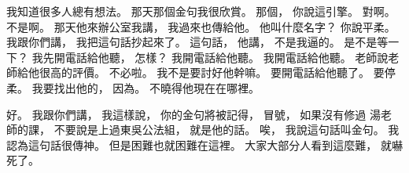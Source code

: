 \hypertarget{w01:cue:3333}{}我知道很多人總有想法。
\hypertarget{w01:cue:3334}{}那天那個金句我很欣賞。
\hypertarget{w01:cue:3335}{}那個，
\hypertarget{w01:cue:3336}{}你說這引擎。
\hypertarget{w01:cue:3337}{}對啊。
\hypertarget{w01:cue:3338}{}不是啊。
\hypertarget{w01:cue:3339}{}那天他來辦公室我講，
\hypertarget{w01:cue:3340}{}我過來也傳給他。
\hypertarget{w01:cue:3341}{}他叫什麼名字？
\hypertarget{w01:cue:3342}{}你說平柔。
\hypertarget{w01:cue:3343}{}我跟你們講，
\hypertarget{w01:cue:3344}{}我把這句話抄起來了。
\hypertarget{w01:cue:3345}{}這句話，
\hypertarget{w01:cue:3346}{}他講，
\hypertarget{w01:cue:3347}{}不是我逼的。
\hypertarget{w01:cue:3348}{}是不是等一下？
\hypertarget{w01:cue:3349}{}我先開電話給他聽，
\hypertarget{w01:cue:3350}{}怎樣？
\hypertarget{w01:cue:3351}{}我開電話給他聽。
\hypertarget{w01:cue:3352}{}我開電話給他聽。
\hypertarget{w01:cue:3353}{}老師說老師給他很高的評價。
\hypertarget{w01:cue:3354}{}不必啦。
\hypertarget{w01:cue:3355}{}我不是要討好他幹嘛。
\hypertarget{w01:cue:3356}{}要開電話給他聽了。
\hypertarget{w01:cue:3357}{}要停柔。
\hypertarget{w01:cue:3358}{}我要找出他的，
\hypertarget{w01:cue:3359}{}因為。
\hypertarget{w01:cue:3360}{}不曉得他現在在哪裡。

\hypertarget{w01:cue:3361}{}好。
\hypertarget{w01:cue:3362}{}我跟你們講，
\hypertarget{w01:cue:3363}{}我這樣說，
\hypertarget{w01:cue:3364}{}你的金句將被記得，
\hypertarget{w01:cue:3365}{}冒號，
\hypertarget{w01:cue:3366}{}如果沒有修過
\hypertarget{w01:cue:3367}{}湯老師的課，
\hypertarget{w01:cue:3368}{}不要說是上過東吳公法組，
\hypertarget{w01:cue:3369}{}就是他的話。
\hypertarget{w01:cue:3370}{}唉，
\hypertarget{w01:cue:3371}{}我說這句話叫金句。
\hypertarget{w01:cue:3372}{}我認為這句話很傳神。
\hypertarget{w01:cue:3373}{}但是困難也就困難在這裡。
\hypertarget{w01:cue:3374}{}大家大部分人看到這麼難，
\hypertarget{w01:cue:3375}{}就嚇死了。

